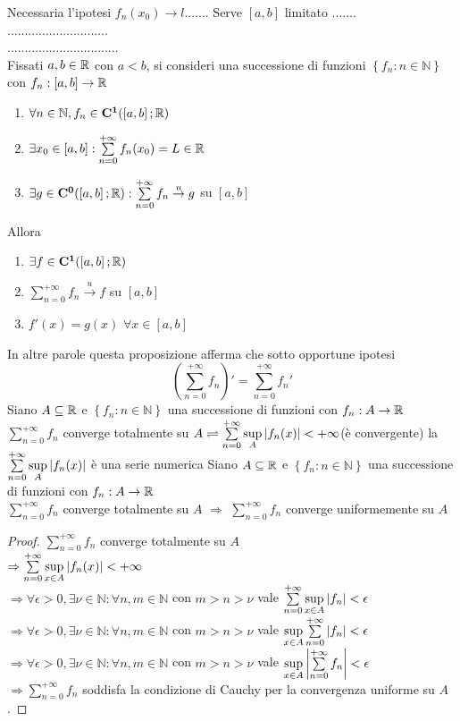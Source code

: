 \observation
Necessaria l'ipotesi $f_n(x_0)\to l$.......
\observation
Serve $\left[a,b\right]$ limitato .......\\
.............................\\
................................\\
\proposition
Fissati $a,b\in \mathbb{R}$ con $a<b$, si consideri una successione di funzioni $\left\{f_n:n\in\mathbb{N}\right\}$ con $f_n:\left[a,b\right]\to \mathbb{R}$
\begin{enumerate}
	\item $\forall n\in\mathbb{N}, f_n\in \mathbf{C^{1}}(\left[a,b\right]; \mathbb{R})$
	\item $\exists x_0\in\left[a,b\right]: \sum\limits_{n=0}^{+\infty}f_n(x_0)=L\in \mathbb{R}$
	\item $\exists g \in \mathbf{C^{0}}(\left[a,b\right]; \mathbb{R}): \sum\limits_{n=0}^{+\infty}f_n\overset{u}{\to}g$ su $\left[a,b\right]$
\end{enumerate}
Allora
\begin{enumerate}
	\item $\exists f\in \mathbf{C^{1}}(\left[a,b\right]; \mathbb{R})$
	\item $\sum\limits_{n=0}^{+\infty}f_n\overset{u}{\to}f$ su $\left[a,b\right]$
	\item $f'(x)=g(x)$ $\forall x\in\left[a,b\right]$
\end{enumerate}
\observation
In altre parole questa proposizione afferma che sotto opportune ipotesi
$$\left(\sum\limits_{n=0}^{+\infty} f_n \right)' =  \sum\limits_{n=0}^{+\infty}f_n'$$
Siano $A\subseteq  \mathbb{R}$ e $\left\{f_n:n\in\mathbb{N}\right\}$ una successione di funzioni con $f_n:A\to \mathbb{R}$\\
$\sum\limits_{n=0}^{+\infty}f_n$ converge totalmente su $A \rightleftharpoons \sum\limits_{n=0}^{+\infty}\sup\limits_{A}\left|f_n(x)\right|<+\infty$(è convergente) 
\observation
la $\sum\limits_{n=0}^{+\infty}\sup\limits_{A}\left|f_n(x)\right|$ è una serie numerica
\proposition
Siano $A\subseteq \mathbb{R}$ e $\left\{f_n:n\in\mathbb{N}\right\}$ una successione di funzioni con $f_n:A\to \mathbb{R}$\\
$\sum\limits_{n=0}^{+\infty}f_n$ converge totalmente su $A$ $\Rightarrow$  $\sum\limits_{n=0}^{+\infty}f_n$ converge uniformemente su $A$
\begin{proof}
	$\sum\limits_{n=0}^{+\infty}f_n$ converge totalmente su $A$\\
	$\Rightarrow \sum\limits_{n=0}^{+\infty}\sup\limits_{x\in A}\left|f_n(x)\right|<+\infty$\\
	$\Rightarrow \forall\epsilon>0, \exists\nu\in\mathbb{N}: \forall n,m\in\mathbb{N}$ con $m>n>\nu$ vale $\sum\limits_{n=0}^{+\infty}\sup\limits_{x\in A}\left|f_n\right|<\epsilon$\\
	$\Rightarrow \forall\epsilon>0, \exists\nu\in\mathbb{N}: \forall n,m\in\mathbb{N}$ con $m>n>\nu$ vale $\sup\limits_{x\in A}\sum\limits_{n=0}^{+\infty}\left|f_n\right|<\epsilon$\\
	$\Rightarrow \forall\epsilon>0, \exists\nu\in\mathbb{N}: \forall n,m\in\mathbb{N}$ con $m>n>\nu$ vale $\sup\limits_{x\in A}\left|\sum\limits_{n=0}^{+\infty}f_n\right|<\epsilon$\\
	$\Rightarrow \sum\limits_{n=0}^{+\infty}f_n$ soddisfa la condizione di Cauchy per la convergenza uniforme su $A$.
\end{proof}
